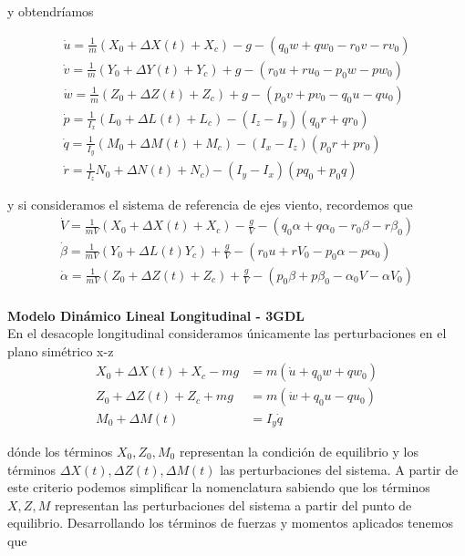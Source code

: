 y obtendríamos 

\begin{gather}
    \dot u  = \frac{1}{m}(X_0 + \Delta X(t) + X_c) - g - (q_0 w + q w_0 - r_0 v - r v_0) \\
    \dot v = \frac{1}{m}(Y_0 + \Delta Y(t) + Y_c) + g -( r_0 u + r u_0 - p_0 w - p w_0) \\
    \dot w = \frac{1}{m}(Z_0 + \Delta Z(t) + Z_c) + g -( p_0 v + p v_0 - q_0 u - q u_0) \\
    \dot p = \frac{1}{I_x}(L_0 + \Delta L(t) + L_c) - (I_z - I_y)(q_0 r + q r_0) \\
    \dot q = \frac{1}{I_y}(M_0 + \Delta M(t) + M_c) - (I_x - I_z) (p_0 r + p r_0) \\
    \dot r = \frac{1}{I_z}N_0 + \Delta N(t) + N_c) - (I_y - I_x)(p q_0 + p_0 q)
\end{gather}

y si consideramos el sistema de referencia de ejes viento, recordemos que 
\begin{gather}
    \dot V  = \frac{1}{mV}(X_0 + \Delta X(t) + X_c) - \frac{g}{V} - (q_0 \alpha + q \alpha_0 - r_0 \beta - r \beta_0) \\
    \dot \beta = \frac{1}{mV}(Y_0 + \Delta L(t) Y_c) + \frac{g}{V} -( r_0 u + r V_0 - p_0 \alpha - p \alpha_0) \\
    \dot \alpha = \frac{1}{mV}(Z_0 + \Delta Z(t) + Z_c) + \frac{g}{V} -( p_0 \beta + p \beta_0 - \alpha_0 V - \alpha V_0) \\
\end{gather}


\textbf{Modelo Dinámico Lineal Longitudinal - 3GDL}\\
En el desacople longitudinal consideramos únicamente las perturbaciones en el plano simétrico x-z
\begin{align}
    X_0 + \Delta X(t) + X_c - mg &= m(\dot u + q_0 w + q w_0) \\
    Z_0 + \Delta Z(t) + Z_c + mg &= m ( \dot w + q_0 u - q u_0) \\
    M_0 + \Delta M(t) &= I_y \dot q
\end{align}

dónde los términos $X_0,Z_0, M_0$ representan la condición de equilibrio y los términos $\Delta X(t),\Delta Z(t), \Delta M(t)$ las perturbaciones del sistema. A partir de este criterio podemos simplificar la nomenclatura sabiendo que los términos $X,Z,M$ representan las perturbaciones del sistema a partir del punto de equilibrio. Desarrollando los términos de fuerzas y momentos aplicados tenemos que

